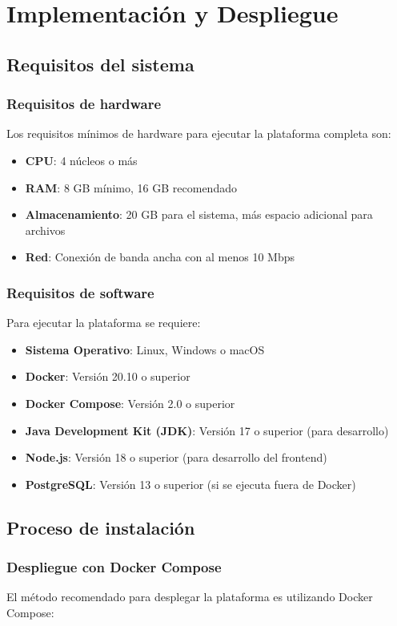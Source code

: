 \documentclass[12pt,a4paper]{report}
\begin{document}
\chapter{Implementación y Despliegue}
\section{Requisitos del sistema}
\subsection{Requisitos de hardware}
Los requisitos mínimos de hardware para ejecutar la plataforma completa son:

\begin{itemize}
    \item \textbf{CPU}: 4 núcleos o más
    \item \textbf{RAM}: 8 GB mínimo, 16 GB recomendado
    \item \textbf{Almacenamiento}: 20 GB para el sistema, más espacio adicional para archivos
    \item \textbf{Red}: Conexión de banda ancha con al menos 10 Mbps
\end{itemize}

\subsection{Requisitos de software}
Para ejecutar la plataforma se requiere:

\begin{itemize}
    \item \textbf{Sistema Operativo}: Linux, Windows o macOS
    \item \textbf{Docker}: Versión 20.10 o superior
    \item \textbf{Docker Compose}: Versión 2.0 o superior
    \item \textbf{Java Development Kit (JDK)}: Versión 17 o superior (para desarrollo)
    \item \textbf{Node.js}: Versión 18 o superior (para desarrollo del frontend)
    \item \textbf{PostgreSQL}: Versión 13 o superior (si se ejecuta fuera de Docker)
\end{itemize}

\section{Proceso de instalación}
\subsection{Despliegue con Docker Compose}
El método recomendado para desplegar la plataforma es utilizando Docker Compose:
\end{document}
